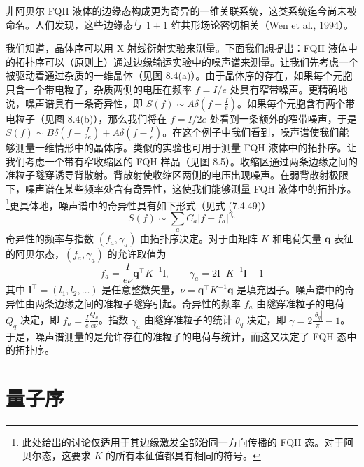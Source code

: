 
非阿贝尔 FQH 液体的边缘态构成更为奇异的一维关联系统，这类系统迄今尚未被命名。人们发现，这些边缘态与 $1+1$ 维共形场论密切相关（Wen et al., 1994）。

我们知道，晶体序可以用 X 射线衍射实验来测量。下面我们想提出：FQH 液体中的拓扑序可以（原则上）通过边缘输运实验中的噪声谱来测量。让我们先考虑一个被驱动着通过杂质的一维晶体（见图 8.4(a)）。由于晶体序的存在，如果每个元胞只含一个带电粒子，杂质两侧的电压在频率 $f=I/e$ 处具有窄带噪声。更精确地说，噪声谱具有一条奇异性，即 $S(f)\sim A\delta(f-\frac{I}{e})$。如果每个元胞含有两个带电粒子（见图 8.4(b)），那么我们将在 $f=I/2e$ 处看到一条额外的窄带噪声，于是 $S(f)\sim B\delta(f-\frac{I}{2e})+A\delta(f-\frac{I}{e})$。在这个例子中我们看到，噪声谱使我们能够测量一维情形中的晶体序。类似的实验也可用于测量 FQH 液体中的拓扑序。让我们考虑一个带有窄收缩区的 FQH 样品（见图 8.5）。收缩区通过两条边缘之间的准粒子隧穿诱导背散射。背散射使收缩区两侧的电压出现噪声。在弱背散射极限下，噪声谱在某些频率处含有奇异性，这使我们能够测量 FQH 液体中的拓扑序。\footnote{此处给出的讨论仅适用于其边缘激发全部沿同一方向传播的 FQH 态。对于阿贝尔态，这要求 $K$ 的所有本征值都具有相同的符号。}更具体地，噪声谱中的奇异性具有如下形式（见式 (7.4.49)）
\begin{equation*}
S(f)\sim\sum_{a}C_{a}|f-f_{a}|^{\gamma_{a}}\tag{8.2.5}
\end{equation*}
奇异性的频率与指数 $(f_{a},\gamma_{a})$ 由拓扑序决定。对于由矩阵 $K$ 和电荷矢量 $\pmb{q}$ 表征的阿贝尔态，$(f_{a},\gamma_{a})$ 的允许取值为
\begin{equation*}
f_{a}=\frac{I}{e\nu}\pmb{q}^{\top}K^{-1}\pmb{l},\qquad\gamma_{a}=2\pmb{l}^{\top}K^{-1}\pmb{l}-1\tag{8.2.6}
\end{equation*}
其中 $\pmb{l}^{\top}=(l_{1},l_{2},\ldots)$ 是任意整数矢量，$\nu=\pmb{q}^{\top}K^{-1}\pmb{q}$ 是填充因子。噪声谱中的奇异性由两条边缘之间的准粒子隧穿引起。奇异性的频率 $f_{a}$ 由隧穿准粒子的电荷 $Q_{q}$ 决定，即 $f_{a}=\frac{I}{e}\frac{Q_{q}}{e\nu}$。指数 $\gamma_{a}$ 由隧穿准粒子的统计 $\theta_{q}$ 决定，即 $\gamma=2\frac{|\theta_{q}|}{\pi}-1$。于是，噪声谱测量的是允许存在的准粒子的电荷与统计，而这又决定了 FQH 态中的拓扑序。

\section{量子序}

